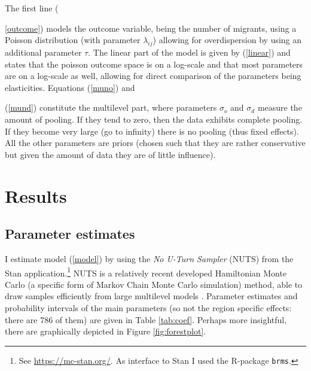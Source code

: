 \documentclass[fleqn,10pt]{SelfArx} %
\begin{document}
        The first line ({\ref{outcome}) models the outcome variable,
          being the number of migrants, using a Poisson distribution
          (with parameter $\lambda_{ij}$) allowing for overdispersion
          by using an additional parameter $\tau$. The linear part of
          the model is given by (\ref{linear}) and states that the
          poisson outcome space is on a log-scale and that most
          parameters are on a log-scale as well, allowing for direct
          comparison of the parameters being elasticities. Equations
          (\ref{muno}) and {(\ref{mund}) constitute the multilevel
            part, where parameters $\sigma_o$ and $\sigma_d$ measure
            the amount of pooling. If they tend to zero, then the
            data exhibits complete pooling. If they become very large
            (go to infinity) there is no pooling (thus fixed
            effects). All the other parameters are priors (chosen such
            that they are rather conservative but given the amount of
            data they are of little influence).
          
        \section{Results}

        \subsection{Parameter estimates}
        
        I estimate model (\ref{model}) by using the \emph{No U-Turn
          Sampler} (NUTS) from the Stan application.\footnote{See \href{https://mc-stan.org/}{https://mc-stan.org/}. As interface to Stan
          \citep[see for an overview article of
          Stan][]{carpenter2017stan} I used the R-package \citep{brms} \texttt{brms}.} NUTS is a relatively recent developed Hamiltonian Monte Carlo (a specific form of Markov
        Chain Monte Carlo simulation) method, able to draw samples
        efficiently from large multilevel models
        \citep{hoffman2014no}. Parameter estimates and probability
        intervals of the main parameters (so not the region specific
        effects: there are 786 of them) are given in Table
        \ref{tab:coef}. Perhaps more insightful, there are graphically
        depicted in Figure \ref{fig:forestplot}.

}}
\end{document}
